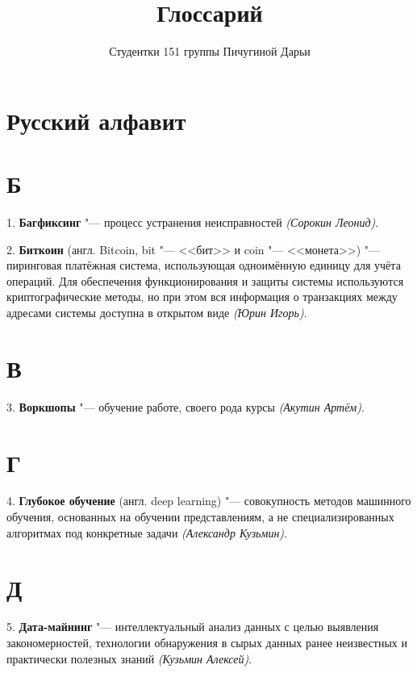\documentclass{article}
\begin{document}
\title{Глоссарий}
\date{} 
\author{Студентки 151 группы Пичугиной Дарьи}
\maketitle

\section*{Русский алфавит}
\section*{Б}

\hspace{0.33cm} 1. \textbf{Багфиксинг} "--- процесс устранения неисправностей \textit{(Сорокин
Леонид)}.

2. \textbf{Биткоин} (англ. Bitcoin, bit "--- <<бит>> и coin "--- <<монета>>)
"--- пиринговая платёжная система, использующая одноимённую единицу для учёта
операций. Для обеспечения функционирования и защиты системы используются
криптографические методы, но при этом вся информация о транзакциях между
адресами системы доступна в открытом виде \textit{(Юрин Игорь)}.

\section*{В}

\hspace{0.33cm} 3. \textbf{Воркшопы} "--- обучение работе, своего рода курсы \textit{(Акутин
Артём)}.

\section*{Г}

\hspace{0.33cm} 4. \textbf{Глубокое обучение} (англ. deep learning) "--- совокупность методов
машинного обучения, основанных на обучении представлениям, а не
специализированных алгоритмах под конкретные задачи \textit{(Александр
Кузьмин)}.

\section*{Д}

\hspace{0.33cm} 5. \textbf{Дата-майнинг} "--- интеллектуальный анализ данных с целью выявления
закономерностей, технологии обнаружения в сырых данных ранее неизвестных и
практически полезных знаний \textit{(Кузьмин Алексей)}.
\end{document}
